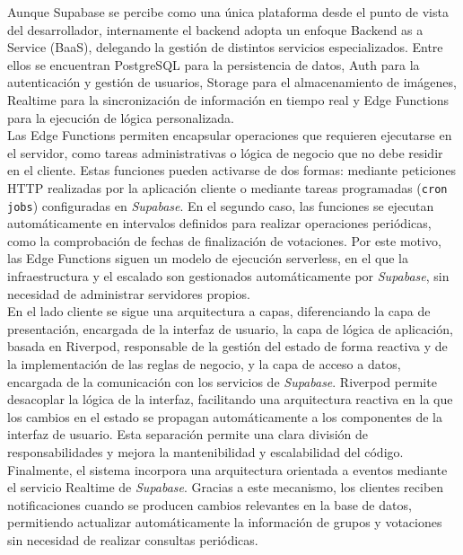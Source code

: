 Aunque Supabase se percibe como una única plataforma desde el punto de vista del desarrollador, internamente el backend adopta un enfoque Backend as a Service (BaaS), delegando la gestión de distintos servicios especializados. Entre ellos se encuentran PostgreSQL para la persistencia de datos, Auth para la autenticación y gestión de usuarios, Storage para el almacenamiento de imágenes, Realtime para la sincronización de información en tiempo real y Edge Functions para la ejecución de lógica personalizada. \\

Las Edge Functions permiten encapsular operaciones que requieren ejecutarse en el servidor, como tareas administrativas o lógica de negocio que no debe residir en el cliente. Estas funciones pueden activarse de dos formas: mediante peticiones HTTP realizadas por la aplicación cliente o mediante tareas programadas (\texttt{cron jobs}) configuradas en \textit{Supabase}. En el segundo caso, las funciones se ejecutan automáticamente en intervalos definidos para realizar operaciones periódicas, como la comprobación de fechas de finalización de votaciones. Por este motivo, las Edge Functions siguen un modelo de ejecución serverless, en el que la infraestructura y el escalado son gestionados automáticamente por \textit{Supabase}, sin necesidad de administrar servidores propios. \\

En el lado cliente se sigue una arquitectura a capas, diferenciando la capa de presentación, encargada de la interfaz de usuario, la capa de lógica de aplicación, basada en Riverpod, responsable de la gestión del estado de forma reactiva y de la implementación de las reglas de negocio, y la capa de acceso a datos, encargada de la comunicación con los servicios de \textit{Supabase}. Riverpod permite desacoplar la lógica de la interfaz, facilitando una arquitectura reactiva en la que los cambios en el estado se propagan automáticamente a los componentes de la interfaz de usuario. Esta separación permite una clara división de responsabilidades y mejora la mantenibilidad y escalabilidad del código. \\

Finalmente, el sistema incorpora una arquitectura orientada a eventos mediante el servicio Realtime de \textit{Supabase}. Gracias a este mecanismo, los clientes reciben notificaciones cuando se producen cambios relevantes en la base de datos, permitiendo actualizar automáticamente la información de grupos y votaciones sin necesidad de realizar consultas periódicas. \\


